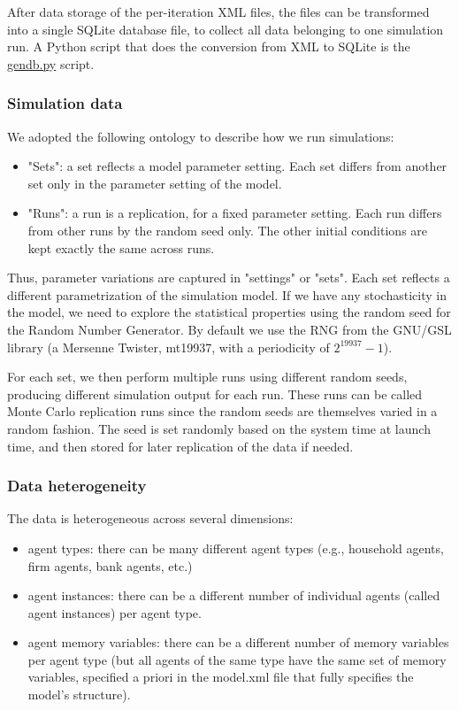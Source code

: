\documentclass[10pt,a4paper]{article}
\begin{document}
After data storage of the per-iteration XML files, the files can be transformed into a single SQLite database file, to collect all data belonging to one simulation run.
A Python script that does the conversion from XML to SQLite is the \url{gendb.py} script.

\subsubsection{Simulation data}
We adopted the following ontology to describe how we run simulations:

\begin{itemize}
\item "Sets": a set reflects a model parameter setting. Each set differs from another set only in the parameter setting of the model.

\item "Runs": a run is a replication, for a fixed parameter setting. Each run differs from other runs by the random seed only. The other initial conditions are kept exactly the same across runs.
\end{itemize}

Thus, parameter variations are captured in "settings" or "sets". Each set reflects a different parametrization of the simulation model.
If we have any stochasticity in the model, we need to explore the statistical properties using the random seed for the Random Number Generator.
By default we use the RNG from the GNU/GSL library (a Mersenne Twister, mt19937, with a periodicity of $2^{19937} - 1$).

For each set, we then perform multiple runs using different random seeds, producing different simulation output for each run.
These runs can be called Monte Carlo replication runs since the random seeds are themselves varied in a random fashion.
The seed is set randomly based on the system time at launch time, and then stored for later replication of the data if needed.


\subsubsection{Data heterogeneity}
The data is heterogeneous across several dimensions:

\begin{itemize}
\item agent types: there can be many different agent types (e.g., household agents, firm agents, bank agents, etc.)

\item agent instances: there can be a different number of individual agents (called agent instances) per agent type.

\item agent memory variables: there can be a different number of memory variables per agent type (but all agents of the same type have the same set of memory variables, specified a priori in the model.xml file that fully specifies the model's structure).
\end{itemize}
\end{document}
